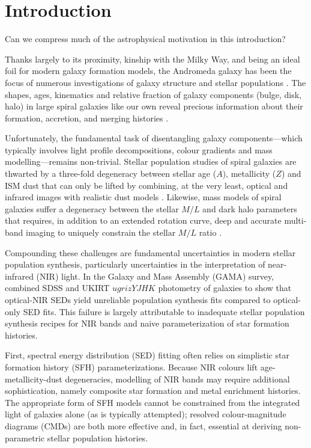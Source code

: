 \documentclass[iop]{emulateapj}
\newcommand{\todo}[1]{\textcolor{BurntOrange}{\textsf{#1}}} %
\begin{document}
\section{Introduction}
\label{sec:intro}

\todo{Can we compress much of the astrophysical motivation in this introduction?}

Thanks largely to its proximity, kinship with the Milky Way, and being an ideal foil for modern galaxy formation models, the Andromeda galaxy has been the focus of numerous investigations of galaxy structure \citep{Ibata:2005,Irwin:2005,McConnachie:2009,Courteau:2011} and stellar populations \citep{Williams:2002,Worthey:2005,Saglia:2010}.
The shapes, ages, kinematics and relative fraction of galaxy components (bulge, disk, halo) in large spiral galaxies like our own reveal precious information about their formation, accretion, and merging histories \citep[see the review of][]{Kormendy:2004}.

Unfortunately, the fundamental task of disentangling galaxy components---which typically involves light profile decompositions, colour gradients and mass modelling---remains non-trivial.
Stellar population studies of spiral galaxies are thwarted by a three-fold degeneracy between stellar age ($A$), metallicity ($Z$) and ISM dust that can only be lifted by combining, at the very least, optical and infrared images with realistic dust models \citep{de-Jong:1996b,MacArthur:2004,Pforr:2012}.
Likewise, mass models of spiral galaxies suffer a degeneracy between the stellar $M/L$ and dark halo parameters that requires, in addition to an extended rotation curve, deep and accurate multi-band imaging to uniquely constrain the stellar $M/L$ ratio \citep{Dutton:2005}. 

Compounding these challenges are fundamental uncertainties in modern stellar population synthesis, particularly uncertainties in the interpretation of near-infrared (NIR) light.
In the Galaxy and Mass Assembly (GAMA) survey, \cite{Taylor:2011} combined SDSS and UKIRT $ugrizYJHK$ photometry of galaxies to show that optical-NIR SEDs yield unreliable population synthesis fits compared to optical-only SED fits.
This failure is largely attributable to inadequate stellar population synthesis recipes for NIR bands and naive parameterization of star formation histories.

First, spectral energy distribution (SED) fitting often relies on simplistic star formation history (SFH) parameterizations.
Because NIR colours lift age-metallicity-dust degeneracies, modelling of NIR bands may require additional sophistication, namely composite star formation and metal enrichment histories.
The appropriate form of SFH models cannot be constrained from the integrated light of galaxies alone (as is typically attempted); resolved colour-magnitude diagrams (CMDs) are both more effective and, in fact, essential at deriving non-parametric stellar population histories. 
\end{document}
